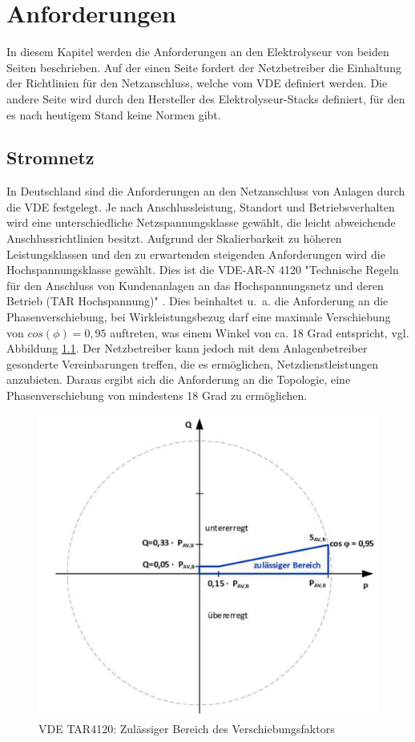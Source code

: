 \chapter{Anforderungen}
\label{chap:Anforderungen}
In diesem Kapitel werden die Anforderungen an den Elektrolyseur von beiden Seiten beschrieben. Auf der einen Seite fordert der Netzbetreiber die Einhaltung der Richtlinien für den Netzanschluss, welche vom \gls{VDE} definiert werden. Die andere Seite wird durch den Hersteller des Elektrolyseur-Stacks definiert, für den es nach heutigem Stand keine Normen gibt. 
\section {Stromnetz} \label{sec:AnfStromnetz}
In Deutschland sind die Anforderungen an den Netzanschluss von Anlagen durch die \gls{VDE} festgelegt. Je nach Anschlussleistung, Standort und Betriebsverhalten wird eine unterschiedliche Netzspannungsklasse gewählt, die leicht abweichende Anschlussrichtlinien besitzt. Aufgrund der Skalierbarkeit zu höheren Leistungsklassen und den zu erwartenden steigenden Anforderungen wird die Hochspannungsklasse gewählt. Dies ist die VDE-AR-N 4120 "Technische Regeln für den Anschluss von Kundenanlagen an das Hochspannungsnetz und deren Betrieb (TAR Hochspannung)" \cite{VDEARN4120}.
Dies beinhaltet u.~a. die Anforderung an die Phasenverschiebung, bei Wirkleistungsbezug darf eine maximale Verschiebung von $cos(\phi)=0,95$ auftreten, was einem Winkel von ca. 18 Grad entspricht, vgl. Abbildung \ref{fig:tar4120pq}. Der Netzbetreiber kann jedoch mit dem Anlagenbetreiber gesonderte Vereinbarungen treffen, die es ermöglichen, Netzdienstleistungen anzubieten. Daraus ergibt sich die Anforderung an die Topologie, eine Phasenverschiebung von mindestens 18 Grad zu ermöglichen.\\
\begin{figure}
	\centering
	\includegraphics[width=0.6\linewidth]{content/Grafiken/TAR4120_PQ}
	\caption[Zulässiger Bereich des Verschiebungsfaktors cos $\phi$ bei Wirkleistungsbezug]{VDE TAR4120: Zulässiger Bereich des Verschiebungsfaktors \cite{VDEARN4120}}
	\label{fig:tar4120pq}
\end{figure}
